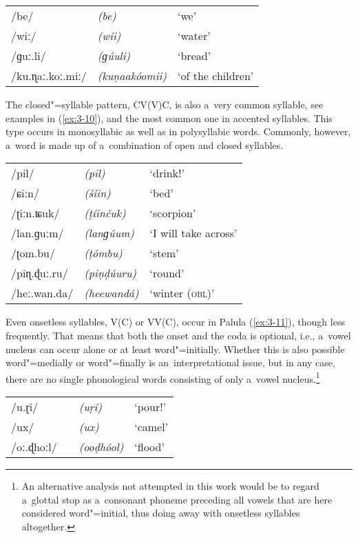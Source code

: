 \begin{exe}
\extab
\label{ex:3-9}
\begin{tabular}{ l l l }
/be/ &
\textit{(be)} &
`we'\\
/wiː/ &
\textit{(wíi)} &
`water'\\
/ɡuː.li/ &
\textit{(ɡúuli)} &
`bread'\\
/ku.ɳaː.koː.miː/ &
\textit{(kuṇaakóomii)} &
`of the children'\\
\end{tabular}
\end{exe}



The closed"=syllable pattern, CV(V)C, is also a~very common syllable, see examples in (\ref{ex:3-10}), and the most common one in accented syllables. This type occurs in monosyllabic as well as in polysyllabic words. Commonly, however, a~word is made up of a~combination of open and closed syllables. 


\begin{exe}
\extab
\label{ex:3-10} 
\begin{tabular}{ l l l }
/pil/ &
\textit{(pil)} &
`drink!' \\
/ɕiːn/ &
\textit{(\v{s}íin)} &
`bed'\\
/ʈiːn.ʨuk/ &
\textit{(ṭíinčuk)} &
`scorpion'\\
/lan.ɡuːm/ &
\textit{(lanɡúum)} &
`I will take across'\\
/ʈom.bu/ &
\textit{(ṭómbu)} &
`stem'\\
/piɳ.ɖuː.ru/ &
\textit{(piṇḍúuru)} &
`round'\\
/heː.wan.da/ &
\textit{(heewandá)} &
`winter (\textsc{obl)}'\\
\end{tabular}
\end{exe}


Even onsetless syllables, V(C) or VV(C), occur in Palula (\ref{ex:3-11}), though less frequently. That means that both the onset and the coda is optional, i.e., a~vowel nucleus can occur alone or at least word"=initially. Whether this is also possible word"=medially or word"=finally is an~interpretational issue, but in any case, there are no single phonological words consisting of only a~vowel nucleus.\footnote{An alternative analysis not attempted in this work would be to regard a~glottal stop as a~consonant phoneme preceding all vowels that are here considered word"=initial, thus doing away with onsetless syllables altogether.}


\begin{exe}
\extab
\label{ex:3-11}
\begin{tabular}{ l l l }
/u.ɽi/ &
\textit{(uṛí)} &
`pour!' \\
/ux/ &
\textit{(ux)} &
`camel'\\
/oː.ɖhoːl/\ \ &
\textit{(ooḍhóol)} &
`flood'\\
\end{tabular}
\end{exe}


